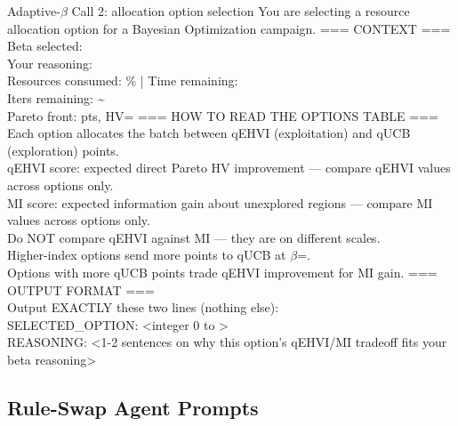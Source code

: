 \begin{fragmentbox}{Adaptive-$\beta$ Call 2: allocation option selection}
\promptfont
You are selecting a resource allocation option for a Bayesian Optimization campaign.
\vspace{0.35em}
=== CONTEXT ===\\
Beta selected: \\
Your reasoning: \\
Resources consumed: \%  |  Time remaining: \\
Iters remaining: \~{}\\
Pareto front:  pts, HV=
\vspace{0.35em}
=== HOW TO READ THE OPTIONS TABLE ===\\
Each option allocates the batch between qEHVI (exploitation) and qUCB (exploration) points.\\
qEHVI score: expected direct Pareto HV improvement --- compare qEHVI values across options only.\\
MI score: expected information gain about unexplored regions --- compare MI values across options only.\\
Do NOT compare qEHVI against MI --- they are on different scales.\\
Higher-index options send more points to qUCB at $\beta$=.\\
Options with more qUCB points trade qEHVI improvement for MI gain.
\vspace{0.35em}
\vspace{0.35em}
=== OUTPUT FORMAT ===\\
Output EXACTLY these two lines (nothing else):\\
SELECTED\_OPTION: <integer 0 to >\\
REASONING: <1-2 sentences on why this option's qEHVI/MI tradeoff fits your beta reasoning>
\end{fragmentbox}

\subsection{Rule-Swap Agent Prompts}
\label{app:prompts_rule_swap}


